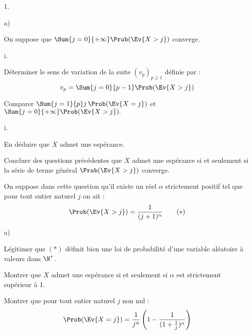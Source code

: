 \documentclass[11pt]{article}%
\begin{document}
\begin{noliste}{1.}
\begin{noliste}{a)}
  \item On suppose que $\Sum{j=0}{+\infty} \Prob(\Ev{X >j})$ converge.
    \begin{nonoliste}{i.}
    \item Déterminer le sens de variation de la suite $(v_p)_{p \geq
        1}$ définie par :
      \[
      v_p= \Sum{j=0}{p-1} \Prob(\Ev{X >j})
      \]
      
      

    \item Comparer $\Sum{j=1}{p} j \, \Prob(\Ev{X =j})$ et
      $\Sum{j=0}{+\infty} \Prob(\Ev{X >j}).$
    \end{nonoliste}

      

    \begin{nonoliste}{i.}
      \setcounter{enumiii}{2}
    \item En déduire que $X$ admet une espérance.

      

    \end{nonoliste}
   
  \item Conclure des questions précédentes que $X$ admet une espérance
    si et seulement si la série de terme général $\Prob(\Ev{X>j})$
    converge.

    
%     
  \end{noliste}

\item On suppose dans cette question qu'il existe un réel $\alpha$
  strictement positif tel que pour tout entier naturel $j$ on ait :
  \[
  \Prob(\Ev{X >j})= \dfrac{1}{(j+1)^{\alpha}} \qquad (\ast)
  \]
  \begin{noliste}{a)}
  \item Légitimer que $(\ast)$ définit bien une loi de probabilité d'une 
    variable aléatoire à valeurs dans $\N^*$.
    
    




  \item Montrer que $X$ admet une espérance si et seulement si $\alpha$ 
    est strictement supérieur à 1.

    

  \item Montrer que pour tout entier naturel $j$ non nul :
    \[
    \Prob(\Ev{X=j}) = \dfrac{1}{j^{\alpha}} \left( 1 -
      \dfrac{1}{(1+\frac{1}{j})^{\alpha}}\right)
    \]
    
    


\end{noliste}
\end{noliste}
\end{document}
